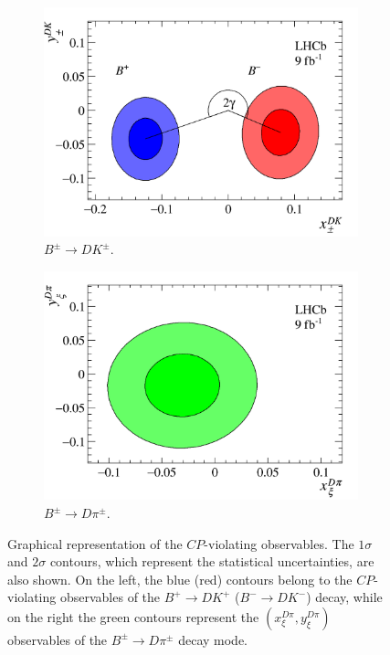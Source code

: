 \documentclass[12pt, a4paper, notitlepage, onecolumn]{article}
\begin{document}
\begin{figure}[htb]
    \centering
    \begin{subfigure}{0.5\textwidth}
        \includegraphics[width=1\textwidth]{Plots/B2DK_CP_Observables_Contours.png}
        \caption{$B^\pm\to DK^\pm$.}
        \label{figure:CP_observables_DK}
    \end{subfigure}%
    \begin{subfigure}{0.5\textwidth}
        \includegraphics[width=1\textwidth]{Plots/B2Dpi_CP_Observables_Contours.png}
        \caption{$B^\pm\to D\pi^\pm$.}
        \label{figure:CP_observables_Dpi}
    \end{subfigure}
    \caption{Graphical representation of the $C\!P$-violating observables. The $1\sigma$ and $2\sigma$ contours, which represent the statistical uncertainties, are also shown. On the left, the blue (red) contours belong to the $C\!P$-violating observables of the $B^+\to DK^+$ ($B^-\to DK^-$) decay, while on the right the green contours represent the $(x_\xi^{D\pi}, y_\xi^{D\pi})$ observables of the $B^\pm\to D\pi^\pm$ decay mode.}
    \label{figure:CP_observables}
\end{figure}
\end{document}
